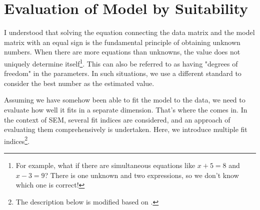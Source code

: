 \documentclass{ltjsbook}
\begin{document}
\section{Evaluation of Model by Suitability}

I understood that solving the equation connecting the data matrix and the model matrix with an equal sign is the fundamental principle of obtaining unknown numbers.
When there are more equations than unknowns, the value does not uniquely determine itself\footnote{For example, what if there are simultaneous equations like $x+5=8$ and $x-3=9$? There is one unknown and two expressions, so we don't know which one is correct!}. This can also be referred to as having "degrees of freedom" in the parameters. In such situations, we use a different standard to consider the best number as the estimated value.

Assuming we have somehow been able to fit the model to the data, we need to evaluate how well it fits in a separate dimension. That's where the  comes in. In the context of SEM, several fit indices are considered, and an approach of evaluating them comprehensively is undertaken. Here, we introduce multiple fit indices\footnote{The description below is modified based on \textcite {Kosugi2014Mplus}.}.

\end{document}
